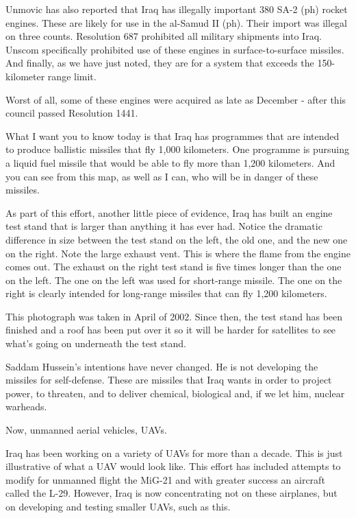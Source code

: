 \documentclass[10pt,a4paper]{article}
\begin{document}
Unmovic has also reported that Iraq has illegally important 380 SA-2 (ph) rocket engines. These are likely for use in the al-Samud II (ph). Their import was illegal on three counts. Resolution 687 prohibited all military shipments into Iraq. Unscom specifically prohibited use of these engines in surface-to-surface missiles. And finally, as we have just noted, they are for a system that exceeds the 150-kilometer range limit.

Worst of all, some of these engines were acquired as late as December - after this council passed Resolution 1441.

What I want you to know today is that Iraq has programmes that are intended to produce ballistic missiles that fly 1,000 kilometers. One programme is pursuing a liquid fuel missile that would be able to fly more than 1,200 kilometers. And you can see from this map, as well as I can, who will be in danger of these missiles.

As part of this effort, another little piece of evidence, Iraq has built an engine test stand that is larger than anything it has ever had. Notice the dramatic difference in size between the test stand on the left, the old one, and the new one on the right. Note the large exhaust vent. This is where the flame from the engine comes out. The exhaust on the right test stand is five times longer than the one on the left. The one on the left was used for short-range missile. The one on the right is clearly intended for long-range missiles that can fly 1,200 kilometers.

This photograph was taken in April of 2002. Since then, the test stand has been finished and a roof has been put over it so it will be harder for satellites to see what's going on underneath the test stand.

Saddam Hussein's intentions have never changed. He is not developing the missiles for self-defense. These are missiles that Iraq wants in order to project power, to threaten, and to deliver chemical, biological and, if we let him, nuclear warheads.

Now, unmanned aerial vehicles, UAVs.

Iraq has been working on a variety of UAVs for more than a decade. This is just illustrative of what a UAV would look like. This effort has included attempts to modify for unmanned flight the MiG-21 and with greater success an aircraft called the L-29. However, Iraq is now concentrating not on these airplanes, but on developing and testing smaller UAVs, such as this.
\end{document}
